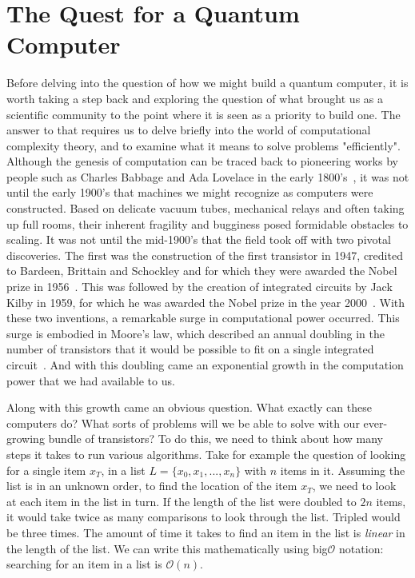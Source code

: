 \chapter{The Quest for a Quantum Computer}
Before delving into the question of how we might build a quantum computer, it is worth taking a step
back and exploring the question of what brought us as a scientific community to the point where
it is seen as a priority to build one. The answer to that requires us to delve briefly into
the world of computational complexity theory, and to examine what it means to solve problems "efficiently".
Although the genesis of computation can be traced back to pioneering works by people such as Charles Babbage
and Ada Lovelace in the early 1800's~\cite{Bowden:1953:FTS:1102044}, it was not until the early 1900's that
machines we might recognize as computers were constructed. Based on delicate vacuum tubes, mechanical relays
and often taking up full rooms, their inherent fragility and bugginess posed formidable obstacles to scaling. 
It was not until the mid-1900's that the field took off with two pivotal discoveries. The first
was the construction of the first transistor in 1947, credited to Bardeen, Brittain and Schockley and for which
they were awarded the Nobel prize in 1956~\cite{nobel1956}. This was followed by the creation of integrated circuits by Jack Kilby
in 1959, for which he was awarded the Nobel prize in the year 2000~\cite{nobel2000}. With these two inventions, a remarkable 
surge in computational power occurred. This surge is embodied in Moore's law, which described an annual
doubling in the number of transistors that it would be possible to fit on a single integrated circuit~\cite{4785860}.
And with this doubling came an exponential growth in the computation power that we had available to us.

Along with this growth came an obvious question. What exactly can these computers do? What sorts of
problems will we be able to solve with our ever-growing bundle of transistors? To do this, we need to
think about how many steps it takes to run various algorithms. Take for example the question of looking
for a single item $x_T$, in a list $L = \{x_0, x_1, ..., x_n\}$ with $n$ items in it. Assuming the list
is in an unknown order, to find the location of the item $x_T$, we need to look at each item in the list
in turn. If the length of the list were doubled to $2n$ items, it would take twice as many comparisons to
look through the list. Tripled would be three times. The amount of time it takes to find an item in the
list is \emph{linear} in the length of the list. We can write this mathematically using big$\mathcal{O}$ 
notation: searching for an item in a list is $\mathcal{O}(n)$. 

